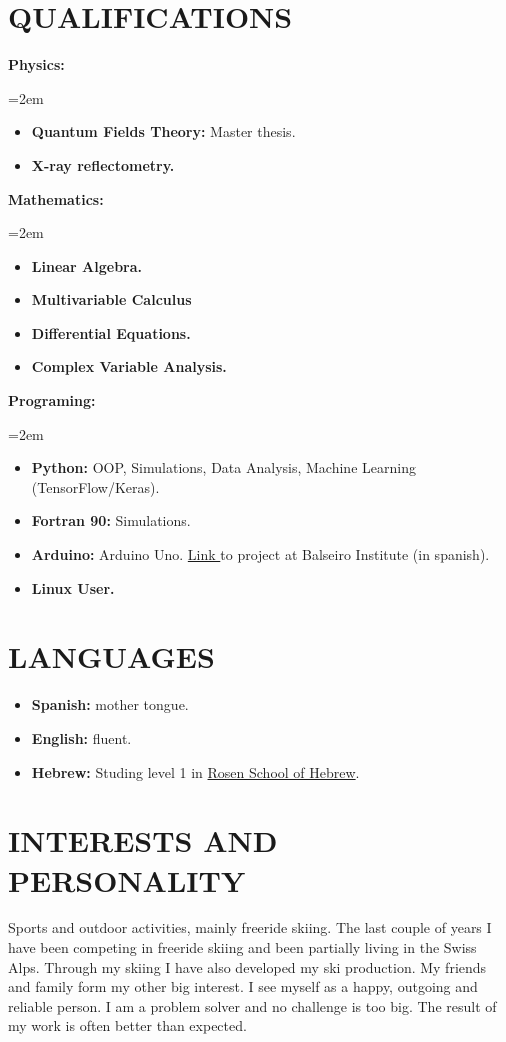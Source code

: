 \documentclass[paper=letter,fontsize=11pt]{scrartcl} %
\newcommand{\sepspace}{\vspace*{1em}}		%
\newcommand{\NewPart}[2]{\section*{\uppercase{#1} \small \normalfont #2}}
\newcommand{\WorkEntry}[5]{
		\noindent \textbf{#1}
        \noindent \small \textit{#2}
        \hfill      %
        \colorbox{White}{%
			\parbox{6em}{%
			\hfill\color{Black}#3}} \par  %
		\noindent \textit{#4} \par        %
		\noindent\hangindent=2em\hangafter=0 \small #5 %
		\normalsize \par}
\newcommand{\Text}[1]{\par       
		\noindent \small #1 
		\normalsize \par}
\begin{document}
\sepspace



\NewPart{QUALIFICATIONS}{}



\sepspace

\WorkEntry{Physics:}{}{}{}{
\begin{itemize}
\item \textbf{Quantum Fields Theory:} Master thesis.
\item \textbf{X-ray reflectometry.} 
\end{itemize}
}

\sepspace

\WorkEntry{Mathematics:}{}{}{}{
\begin{itemize}
\item \textbf{Linear Algebra.}
\item \textbf{Multivariable Calculus}
\item \textbf{Differential Equations.}
\item \textbf{Complex Variable Analysis.} 
\end{itemize}
}

\sepspace

\WorkEntry{Programing:}{}{}{}{
\begin{itemize}
\item \textbf{Python:} OOP, Simulations, Data Analysis, Machine Learning (TensorFlow/Keras).
\item \textbf{Fortran 90:} Simulations.
\item \textbf{Arduino:} Arduino Uno. {\href{https://drive.google.com/drive/folders/1y01BjDnIPS2QOX3Vo68r9A8HA9tstj1S}{Link }} to project at Balseiro Institute (in spanish).
\item \textbf{Linux User.}
\end{itemize}
}

\NewPart{LANGUAGES}{}

\begin{itemize}
\item \textbf{Spanish:} mother tongue.
\item \textbf{English:} fluent.
\item \textbf{Hebrew:} Studing level 1 in {\href{https://rosenhebrewschool.com/}{Rosen School of Hebrew}}.
\end{itemize}




\NewPart{Interests and personality}{}

\Text{Sports and outdoor activities, mainly freeride skiing. The last couple of years I have been competing in freeride skiing and been partially living in the Swiss Alps. Through my skiing I have also developed my ski production. My friends and family form my other big interest. I see myself as a happy, outgoing and reliable person. I am a problem solver and no challenge is too big. The result of my work is often better than expected.}
\end{document}
